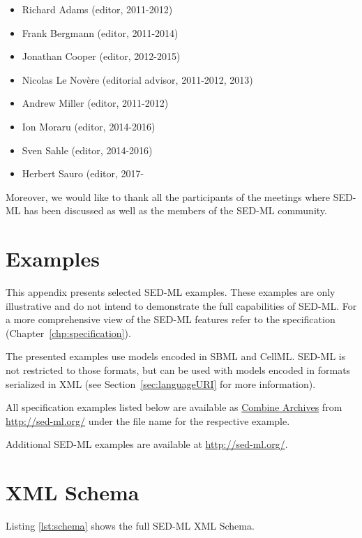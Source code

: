 \documentclass[pdftex,rgb,dvipsnames,svgnames,hyperref,table]{report}
\begin{document}
\begin{itemize}
\item Richard Adams (editor, 2011-2012)
\item Frank Bergmann (editor, 2011-2014)
\item Jonathan Cooper (editor, 2012-2015)
\item Nicolas Le Nov{\`e}re (editorial advisor, 2011-2012, 2013)
\item Andrew Miller (editor, 2011-2012)
\item Ion Moraru (editor, 2014-2016)
\item Sven Sahle (editor, 2014-2016)
\item Herbert Sauro (editor, 2017-
\end{itemize}

Moreover, we would like to thank all the participants of the meetings where SED-ML has been discussed as well as the members of the SED-ML community.

\appendix

\chapter{Examples}
\label{app:examples}
This appendix presents selected SED-ML examples. These examples are only illustrative and do not intend to demonstrate the full capabilities of SED-ML. For a more comprehensive view of the SED-ML features refer to the specification (Chapter~\ref{chp:specification}). 

The presented examples use models encoded in SBML and CellML. SED-ML is not restricted to those formats, but can be used with models encoded in formats serialized in XML (see Section~\ref{sec:languageURI} for more information).

All specification examples listed below are available as \hyperref[sec:archive]{Combine Archives} from \url{http://sed-ml.org/} under the  file name for the respective example. 

Additional SED-ML examples are available at \url{http://sed-ml.org/}.




\chapter{XML Schema}
\label{app:schema}
Listing \ref{lst:schema} shows the full SED-ML XML Schema.



\end{document}

